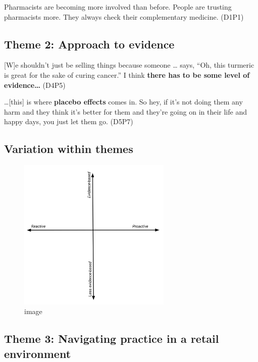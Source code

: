 \documentclass[]{article}
\begin{document}
Pharmacists are becoming more involved than before. People are trusting
pharmacists more. They always check their complementary medicine. (D1P1)

\subsection{Theme 2: Approach to
evidence}\label{theme-2-approach-to-evidence}

{[}W{]}e shouldn't just be selling things because someone \ldots{} says,
``Oh, this turmeric is great for the sake of curing cancer.'' I think
\textbf{there has to be some level of evidence\ldots{}} (D4P5)

\ldots{}{[}this{]} is where \textbf{placebo effects} comes in. So hey,
if it's not doing them any harm and they think it's better for them and
they're going on in their life and happy days, you just let them go.
(D5P7)

\subsection{Variation within themes}\label{variation-within-themes}

\begin{figure}
\centering
\includegraphics[width=0.65000\textwidth]{files/CMEthics_context3.png}
\caption{image}
\end{figure}

\subsection{Theme 3: Navigating practice in a retail
environment}\label{theme-3-navigating-practice-in-a-retail-environment}
\end{document}
